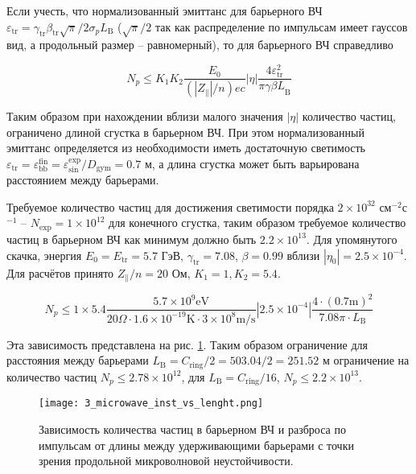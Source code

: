 \noindent Если учесть, что нормализованный эмиттанс для барьерного ВЧ $\varepsilon_{\textrm{tr}}=\gamma_{\textrm{tr}}\beta_{\textrm{tr}}\sqrt{\pi}/2\sigma_p L_{\textrm{B}}$ ($\sqrt{\pi}/2$ так как распределение по импульсам имеет гауссов вид, а продольный размер -- равномерный), то для барьерного ВЧ справедливо

\begin{equation}
N_p\le K_1K_2\frac{E_0}{\left(\left|Z_\parallel\right|/n\right)ec}\left|\eta\right|\frac{4\varepsilon_{\text{tr}}^2}{{\pi\gamma\beta L}_{\textrm{B}}}
\label{eq:microwave_instability_2}
\end{equation}

\noindent Таким образом при нахождении вблизи малого значения $\left|\eta\right|$ количество частиц, ограничено длиной сгустка в барьерном ВЧ. При этом нормализованный эмиттанс определяется из необходимости иметь достаточную светимость $\varepsilon_{\textrm{tr}}=\varepsilon_{\textrm{bb}}^{\textrm{fin}}=\varepsilon_{\textrm{sin}}^{\textrm{exp}}/D_{\textrm{gym}}=0.7$ м, а длина сгустка может быть варьирована расстоянием между барьерами. 

\par Требуемое количество частиц для достижения светимости порядка $2\times10^{32}$ см$^{-2}$с$^{-1}$ – $N_{\textrm{exp}}=1\times10^{12}$ для конечного сгустка, таким образом требуемое количество частиц в барьерном ВЧ как минимум должно быть $2.2\times10^{13}$. Для упомянутого скачка, энергия $E_0=E_{\textrm{tr}}=5.7$ ГэВ, $\gamma_{\textrm{tr}}=7.08$, $\beta=0.99$ вблизи $\left|\eta_0\right|=2.5\times10^{-4}$. Для расчётов принято $Z_\parallel/n=20$ Ом, $K_1=1, K_2=5.4$.

\begin{equation}
N_p\le1\times5.4\frac{5.7\times10^{9} \text{eV}}{20 \Omega \cdot 1.6\times10^{-19} \text{K} \cdot 3\times10^{8} \text{m/s}} |2.5\times10^{-4}|\frac{4\cdot(0.7 \text{m})^2}{7.08 \pi \cdot L_{\text{B}}}
\label{eq:microwave_instability_example}
\end{equation}

\noindent Эта зависимость представлена на рис. \ref{fig:3_microwave_inst_vs_lenght.png}. Таким образом ограничение для расстояния между барьерами $L_{\text{B}}=C_{\textrm{ring}}/2=503.04/2=251.52$ м ограничение на количество частиц $N_p\le2.78\times10^{12}$, для $L_{\textrm{B}}=C_{\textrm{ring}}/16$, $N_p\le2.2\times10^{13}$.

\begin{figure}
\centering
   \texttt{[image: 3\_microwave\_inst\_vs\_lenght.png]}
   \caption{Зависимость количества частиц в барьерном ВЧ и разброса по импульсам от длины между удерживающими барьерами с точки зрения продольной микроволновой неустойчивости.}
   \label{fig:3_microwave_inst_vs_lenght.png}
\end{figure}

